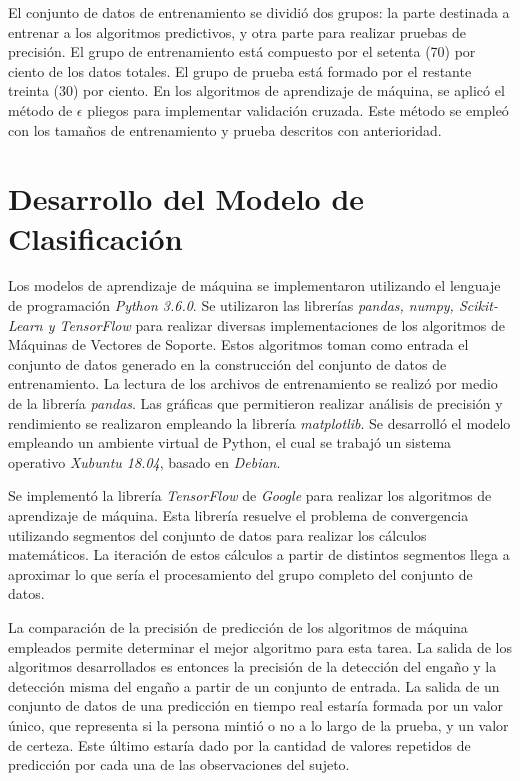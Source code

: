 El conjunto de datos de entrenamiento se dividió dos grupos: la parte destinada a entrenar a los algoritmos predictivos, y otra parte para realizar pruebas de precisión. El grupo de entrenamiento está compuesto por el setenta (70) por ciento de los datos totales. El grupo de prueba está formado por el restante treinta (30) por ciento. En los algoritmos de aprendizaje de máquina, se aplicó el método de $\epsilon$ pliegos para implementar validación cruzada. Este método se empleó con los tamaños de entrenamiento y prueba descritos con anterioridad.     

\section{Desarrollo del Modelo de Clasificación}
Los modelos de aprendizaje de máquina se implementaron utilizando el lenguaje de programación \textit{Python 3.6.0}. Se utilizaron las librerías \textit{pandas, numpy, Scikit-Learn y TensorFlow} para realizar diversas implementaciones de los algoritmos de Máquinas de Vectores de Soporte. Estos algoritmos toman como entrada el conjunto de datos generado en la construcción del conjunto de datos de entrenamiento. La lectura de los archivos de entrenamiento se realizó por medio de la librería \textit{pandas}. Las gráficas que permitieron realizar análisis de precisión y rendimiento se realizaron empleando la librería \textit{matplotlib}. Se desarrolló el modelo empleando un ambiente virtual de Python, el cual se trabajó un sistema operativo \textit{Xubuntu 18.04}, basado en \textit{Debian}.

Se implementó la librería \textit{TensorFlow} de \textit{Google} para realizar los algoritmos de aprendizaje de máquina. Esta librería resuelve el problema de convergencia utilizando segmentos del conjunto de datos para realizar los cálculos matemáticos. La iteración de estos cálculos a partir de distintos segmentos llega a aproximar lo que sería el procesamiento del grupo completo del conjunto de datos. 

La comparación de la precisión de predicción de los algoritmos de máquina empleados permite determinar el mejor algoritmo para esta tarea. La salida de los algoritmos desarrollados es entonces la precisión de la detección del engaño y la detección misma del engaño a partir de un conjunto de entrada. La salida de un conjunto de datos de una predicción en tiempo real estaría formada por un valor único, que representa si la persona mintió o no a lo largo de la prueba, y un valor de certeza. Este último estaría dado por la cantidad de valores repetidos de predicción por cada una de las observaciones del sujeto.  


